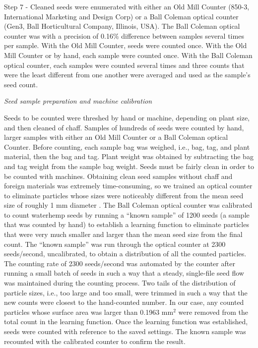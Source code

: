 \documentclass[utf8]{frontiersSCNS}
\begin{document}
Step 7 - Cleaned seeds were enumerated with either an Old Mill Counter (850-3, International Marketing and Design Corp) or a Ball Coleman optical counter (Gen3, Ball Horticultural Company, Illinois, USA). The Ball Coleman optical counter was with a precision of 0.16\% difference between samples several times per sample. With the Old Mill Counter, seeds were counted once. With the Old Mill Counter or by hand, each sample were counted once. With the Ball Coleman optical counter, each samples were counted several times and three counts that were the least different from one another were averaged and used as the sample's seed count.

\emph{Seed sample preparation and machine calibration}

Seeds to be counted were threshed by hand or machine, depending on plant size, and then cleaned of chaff.
Samples of hundreds of seeds were counted by hand, larger samples with either an Old Mill Counter or a Ball Coleman optical Counter. Before counting, each sample bag was weighed, i.e., bag, tag, and plant material, then the bag and tag.
Plant weight was obtained by subtracting the bag and tag weight from the sample bag weight.
Seeds must be fairly clean in order to be counted with machines.
Obtaining clean seed samples without chaff and foreign materials was extremely time-consuming, so we trained an optical counter to eliminate particles whose sizes were noticeably different from the mean seed size of roughly 1 mm diameter \citep{bellTimeRequirementPollination2010}.
The Ball Coleman optical counter was calibrated to count waterhemp seeds by running a ``known sample'' of 1200 seeds (a sample that was counted by hand) to establish a learning function to eliminate particles that were very much smaller and larger than the mean seed size from the final count.
The ``known sample'' was run through the optical counter at 2300 seeds/second, uncalibrated, to obtain a distribution of all the counted particles.
The counting rate of 2300 seeds/second was automated by the counter after running a small batch of seeds in such a way that a steady, single-file seed flow was maintained during the counting process.
Two tails of the distribution of particle sizes, i.e., too large and too small, were trimmed in such a way that the new counts were closest to the hand-counted number.
In our case, any counted particles whose surface area was larger than 0.1963 mm\(^2\) were removed from the total count in the learning function.
Once the learning function was established, seeds were counted with reference to the saved settings.
The known sample was recounted with the calibrated counter to confirm the result.
\end{document}
